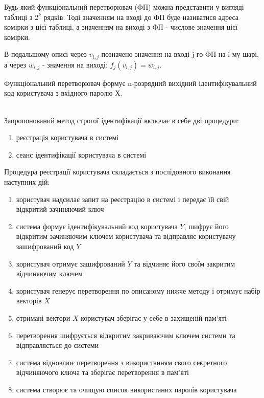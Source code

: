 \documentclass[12pt]{article}
\begin{document}
Будь-який функціональний перетворювач (ФП) можна представити у вигляді таблиці з $2^k$ рядків. Тоді значенням на вході до ФП буде називатися адреса комірки з цієї таблиці, а значенням на виході з ФП - числове значення цієї комірки.

В подальшому описі через $v_{i,j}$ позначено значення на вході j-го ФП на i-му шарі, а через $w_{i,j}$ - значення на виході: $f_j(v_{i,j}) = w_{i,j}$.

Функціональний перетворювач формує n-розрядний вихідний ідентифікувальний код користувача з вхідного паролю Х.

\quad \\

Запропонований метод строгої ідентифікації включає в себе дві процедури:
\begin{enumerate}
\itemsep=0em
\item реєстрація користувача в системі
\item сеанс ідентифікації користувача в системі
\end{enumerate}

Процедура реєстрації користувача складається з послідовного виконання наступних дій:
\begin{enumerate}
\itemsep=0em
\item користувач надсилає запит на реєстрацію в системі і передає їй свій відкритий зачиняючий ключ
\item система формує ідентифікувальний код користувача $Y$, шифрує його відкритим зачиняючим ключем користувача та відправляє користувачу зашифрований код $Y$
\item користувач отримує зашифрований $Y$ та відчиняє його своїм закритим відчиняючим ключем
\item користувач генерує перетворення по описаному нижче методу і отримує набір векторів $X$
\item отримані вектори $X$ користувач зберігає у себе в захищеній пам'яті\\
\item перетворення шифрується відкритим закриваючим ключем системи та відправляється до системи
\item  система відновлює перетворення з використанням свого секретного відчиняючого ключа та зберігає перетворення в пам'яті
\item система створює та очищую список використаних паролів користувача
\end{enumerate}
\end{document}
